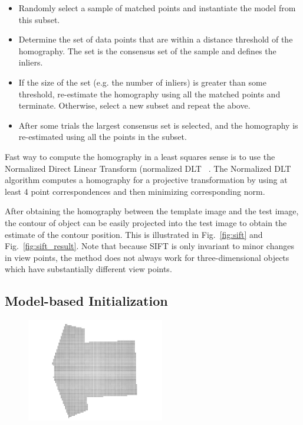 \documentclass[conference]{IEEEtran}
\begin{document}
\begin{itemize}
\item  Randomly select a sample of matched points and instantiate the
  model from this subset.
\item Determine the set of data points that are within a distance
  threshold of the homography. The set is the consensus set of the sample
  and defines the inliers.
\item If the size of the set (e.g. the number of inliers) is greater
  than some threshold, re-estimate the homography using all the matched
  points and terminate. Otherwise, select a new subset and repeat the
  above.
\item After some trials the largest consensus set is selected, and the
  homography is re-estimated using all the points in the subset.
\end{itemize}
Fast way to compute the homography in a least squares sense is to use the Normalized
Direct Linear Transform (normalized
DLT ~\cite{hartley2003multiple}. The Normalized DLT algorithm computes
a homography for a projective transformation by using at least 4 point
correspondences and then minimizing corresponding norm.

After obtaining the homography between the template image and the
test image, the contour of object can be easily projected
into the test image to obtain the estimate of the contour
position. This is illustrated in Fig.~\ref{fig:sift} and
Fig.~\ref{fig:sift_result}. Note that because SIFT is only invariant
to minor changes in view points, the method does not always work for
three-dimensional objects which have substantially different view points.




\subsection{Model-based Initialization}
\label{sec:tifpc}
\begin{figure}[htb]
  \centering
  \includegraphics[width=6cm]{experiments/tshirt/tshirt_pcd.jpg}
\end{figure}
\end{document}
